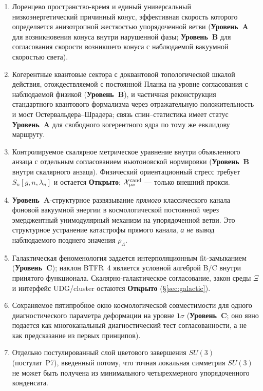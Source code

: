 \documentclass[11pt,a4paper]{article}
\newcommand{\statA}{\textbf{Уровень~A}}
\newcommand{\statB}{\textbf{Уровень~B}}
\newcommand{\statC}{\textbf{Уровень~C}}
\newcommand{\statO}{\textbf{Открыто}}
\begin{document}
\begin{enumerate}[leftmargin=1.4em,itemsep=2pt]
\item Лоренцево пространство-время и единый универсальный
      низкоэнергетический причинный конус, эффективная скорость
      которого определяется анизотропной жесткостью
      упорядоченной ветви
      (\statA{} для возникновения конуса внутри нарушенной фазы;
      \statB{} для согласования скорости возникшего конуса с
      наблюдаемой вакуумной скоростью света).
\item Когерентные квантовые сектора с доквантовой топологической
      шкалой действия, отождествляемой с постоянной Планка на
      уровне согласования с наблюдаемой физикой (\statB), и
      частичная реконструкция
      стандартного квантового формализма через отражательную
      положительность и мост Остервальдера--Шрадера; связь
      спин--статистика имеет статус \statA{} для свободного
      когерентного ядра по тому же евклидову маршруту.
\item Контролируемое скалярное метрическое уравнение внутри
      объявленного анзаца с отдельным согласованием ньютоновской
      нормировки (\statB{} внутри скалярного анзаца).  Физический
      ориентационный стресс требует $S_n[g,n,\lambda_n]$ и остается
      \statO{}; $\mathcal X^{\rm cand}_{\mu\nu}$ — только внешний прокси.
\item \statA{}-структурное развязывание \emph{прямого}
      классического канала фоновой вакуумной энергии в
      космологической постоянной через эмерджентный унимодулярный
      механизм на упорядоченной ветви. Это структурное устранение
      катастрофы прямого канала, \emph{а не} вывод наблюдаемого
      позднего значения $\rho_\Lambda$.
\item Галактическая феноменология задается интерполяционным
      fit-замыканием (\statC{}); наклон BTFR~4 является условной
      алгеброй B/C внутри принятого функционала.  Скалярно-галактическое
      согласование, закон среды $\Xi$ и интерфейс UDG/cluster
      остаются \statO{}
      (\S\ref{sec:galactic}).
\item Сохраняемое пятипробное окно космологической совместимости
      для одного диагностического параметра деформации на уровне
      $1\sigma$ (\statC{}; оно явно подается как
      многоканальный диагностический тест согласованности, а не
      как предсказание из первых принципов).
\item Отдельно постулированный слой цветового завершения $SU(3)$
      (постулат~P7), введенный потому, что точная локальная
      симметрия $SU(3)$ не может быть получена из минимального
      четырехмерного упорядоченного конденсата.
\end{enumerate}
\end{document}

